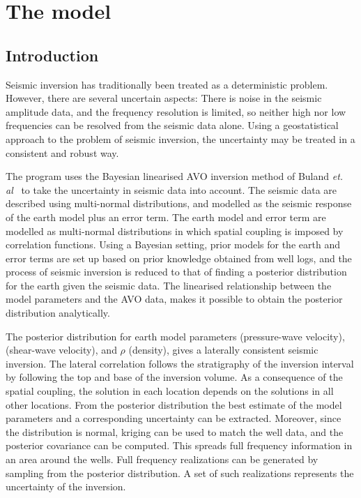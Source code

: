 \chapter{The \crava model}
\label{sec:theory}

\section{Introduction}
Seismic inversion has traditionally been treated as a deterministic
problem. However, there are several uncertain aspects: There is noise
in the seismic amplitude data, and the frequency resolution is
limited, so neither high nor low frequencies can be resolved from the
seismic data alone. Using a geostatistical approach to the problem of
seismic inversion, the uncertainty may be treated in a consistent and
robust way.

The \crava program uses the Bayesian linearised AVO
inversion method of Buland {\it et. al}~\cite{geo68ab2} to take
the uncertainty in seismic data into account. The seismic data are
described using multi-normal distributions, and modelled as the seismic
response of the earth model plus an error term. The earth model and
error term are modelled as multi-normal distributions in which spatial
coupling is imposed by correlation functions. Using a Bayesian
setting, prior models for the earth and error terms are set up based
on prior knowledge obtained from well logs, and the process of seismic
inversion is reduced to that of finding a posterior distribution for
the earth given the seismic data. The linearised relationship between
the model parameters and the AVO data, makes it possible to obtain the
posterior distribution analytically.

The posterior distribution for earth model parameters \vp
(pressure-wave velocity), \vs (shear-wave velocity), and $\rho$
(density), gives a laterally consistent seismic inversion. The lateral
correlation follows the stratigraphy of the inversion interval by
following the top and base of the inversion volume. As a consequence
of the spatial coupling, the solution in each location depends on the
solutions in all other locations. From the posterior distribution the
best estimate of the model parameters and a corresponding uncertainty
can be extracted. Moreover, since the distribution is normal, kriging
can be used to match the well data, and the posterior covariance can
be computed. This spreads full frequency information in an area around
the wells. Full frequency realizations can be generated by sampling
from the posterior distribution. A set of such realizations represents
the uncertainty of the inversion.


